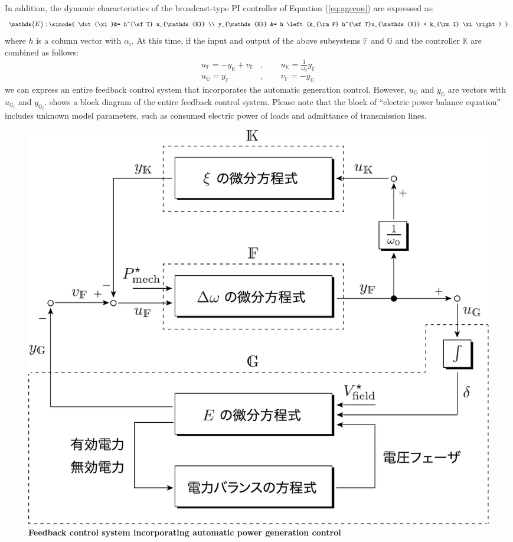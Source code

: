 \documentclass[graybox, envcountchap]{svmult}
\begin{document}
In addition, the dynamic characteristics of the broadcast-type PI controller of Equation (\ref{eq:agccon}) are expressed as:
\begin{align}\label{eq:condsK}
\mathds{K}: \simode{
\dot{\xi}&=  h^{\sf T} u_{\mathds{K}} \\
y_{\mathds{K}} &= h \left(k_{\rm P} h^{\sf T}u_{\mathds{K}} +  k_{\rm I} \xi \right)
}
\end{align}
where $h$ is a column vector with $\alpha_i$.
At this time, if the input and output of the above subsystems $\mathds{F}$ and $\mathds{G}$ and the controller $\mathds{K}$ are combined as follows:
\begin{subequations}\label{eq:connds}
\begin{align}
u_{\mathds{F}} = - y_{\mathds{K}} + v_{\mathds{F}}&
,\qquad u_{\mathds{K}} = \frac{1}{\omega_0} y_{\mathds{F}}	\label{eq:connds1}
\\
u_{\mathds{G}} = y_{\mathds{F}}&
,\qquad
v_{\mathds{F}} = - y_{\mathds{G}}		\label{eq:connds2}
\end{align}
\end{subequations}
we can express an entire feedback control system that incorporates the automatic generation control.
However, $u_{\mathds{G}}$ and $y_{\mathds{G}}$ are vectors with $u_{\mathds{G}_i}$ and $y_{\mathds{G}_i}$.
 shows a block diagram of the entire feedback control system.
Please note that the block of “electric power balance equation” includes unknown model parameters, such as consumed electric power of loads and admittance of transmission lines. 

\begin{figure}[t]
\centering
\includegraphics[width = .85\linewidth]{figs/nonlinBD}
\medskip
\caption{\textbf{Feedback control system incorporating automatic power generation control}}
\label{fig:nonlinBD}
\medskip
\end{figure}
\end{document}
